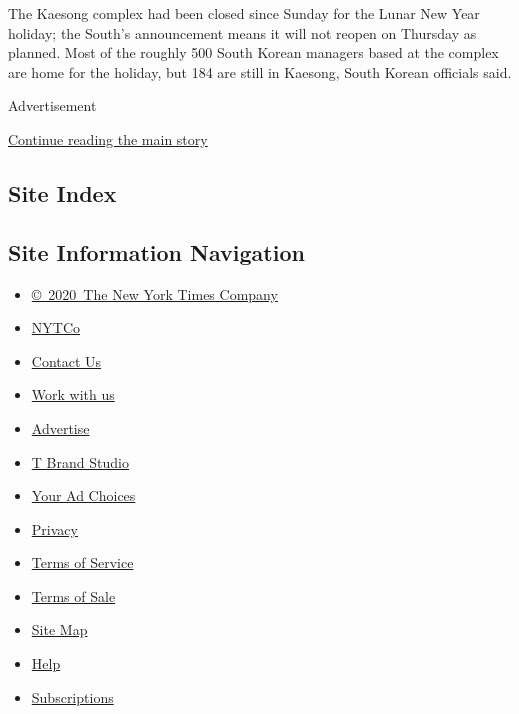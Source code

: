 The Kaesong complex had been closed since Sunday for the Lunar New Year
holiday; the South's announcement means it will not reopen on Thursday
as planned. Most of the roughly 500 South Korean managers based at the
complex are home for the holiday, but 184 are still in Kaesong, South
Korean officials said.

Advertisement

\protect\hyperlink{after-bottom}{Continue reading the main story}

\hypertarget{site-index}{%
\subsection{Site Index}\label{site-index}}

\hypertarget{site-information-navigation}{%
\subsection{Site Information
Navigation}\label{site-information-navigation}}

\begin{itemize}
\tightlist
\item
  \href{https://help.nytimes3xbfgragh.onion/hc/en-us/articles/115014792127-Copyright-notice}{©~2020~The
  New York Times Company}
\end{itemize}

\begin{itemize}
\tightlist
\item
  \href{https://www.nytco.com/}{NYTCo}
\item
  \href{https://help.nytimes3xbfgragh.onion/hc/en-us/articles/115015385887-Contact-Us}{Contact
  Us}
\item
  \href{https://www.nytco.com/careers/}{Work with us}
\item
  \href{https://nytmediakit.com/}{Advertise}
\item
  \href{http://www.tbrandstudio.com/}{T Brand Studio}
\item
  \href{https://www.nytimes3xbfgragh.onion/privacy/cookie-policy\#how-do-i-manage-trackers}{Your
  Ad Choices}
\item
  \href{https://www.nytimes3xbfgragh.onion/privacy}{Privacy}
\item
  \href{https://help.nytimes3xbfgragh.onion/hc/en-us/articles/115014893428-Terms-of-service}{Terms
  of Service}
\item
  \href{https://help.nytimes3xbfgragh.onion/hc/en-us/articles/115014893968-Terms-of-sale}{Terms
  of Sale}
\item
  \href{https://spiderbites.nytimes3xbfgragh.onion}{Site Map}
\item
  \href{https://help.nytimes3xbfgragh.onion/hc/en-us}{Help}
\item
  \href{https://www.nytimes3xbfgragh.onion/subscription?campaignId=37WXW}{Subscriptions}
\end{itemize}

